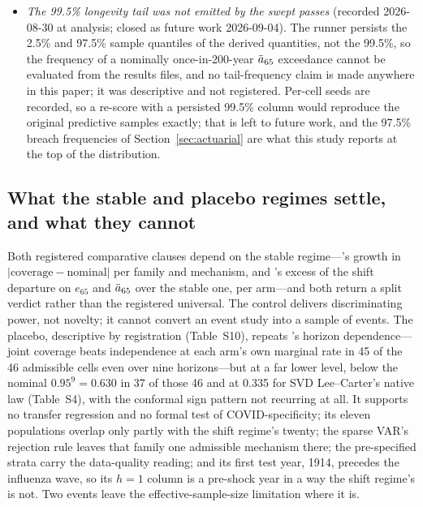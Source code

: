 \begin{itemize}
  (recorded 2026-09-02 at the stable QA gate). HRV and KOR miss the registered
  floor of fifteen contiguous training years at all thirteen stable origins, so
  each stable column is a mean over eighteen populations, sixteen for the GP.
  The sparse VAR's explosive-draw rejection rule thins it further: 297 of the
  520 (population, sex, origin) units survive natively, and of the 223
  excluded, 145 are method-class rejections against 50 structural and 28 other
  (Table~S11). Stable-versus-shift comparisons therefore do not rest on one
  population set; every contrast reported with a test statistic is computed on
  the intersection of cells in which both arms produced a valid row
  (Addendum~3~\S11), the cluster counts of Table~S9 stating it.
\item \emph{The 99.5\% longevity tail was not emitted by the swept passes}
  (recorded 2026-08-30 at analysis; closed as future work 2026-09-04). The
  runner persists the 2.5\% and 97.5\% sample quantiles of the derived
  quantities, not the 99.5\%, so the frequency of a nominally once-in-200-year
  $\ddot{a}_{65}$ exceedance cannot be evaluated from the results files, and no
  tail-frequency claim is made anywhere in this paper; it was descriptive and
  not registered. Per-cell seeds are recorded, so a re-score with a persisted
  99.5\% column would reproduce the original predictive samples exactly; that
  is left to future work, and the 97.5\% breach frequencies of
  Section~\ref{sec:actuarial} are what this study reports at the top of the
  distribution.
\end{itemize}

\subsection{What the stable and placebo regimes settle, and what they cannot}
\label{sec:discussion-regimes}

Both registered comparative clauses depend on the stable regime---\Htwo's
growth in $|\text{coverage}-\text{nominal}|$ per family and mechanism, and
\Hfive's excess of the shift departure on $e_{65}$ and $\ddot{a}_{65}$ over the
stable one, per arm---and both return a split verdict rather than the
registered universal. The control delivers discriminating power, not novelty;
it cannot convert an event study into a sample of events. The placebo,
descriptive by registration (Table~S10), repeats \Hthree's horizon
dependence---joint coverage beats independence at each arm's own marginal rate
in 45 of the 46 admissible cells even over nine horizons---but at a far lower
level, below the nominal $0.95^9=0.630$ in 37 of those 46 and at 0.335 for SVD
Lee--Carter's native law (Table~S4), with the conformal sign pattern not
recurring at all. It supports no transfer regression and no formal test of
COVID-specificity; its eleven populations overlap only partly with the shift
regime's twenty; the sparse VAR's rejection rule leaves that family one
admissible mechanism there; the pre-specified strata carry the data-quality
reading; and its first test year, 1914, precedes the influenza wave, so its
$h=1$ column is a pre-shock year in a way the shift regime's is not. Two events
leave the effective-sample-size limitation where it is.

